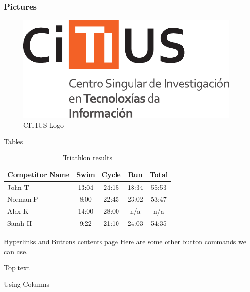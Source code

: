 \documentclass[aspectratio=169]{beamer}
\begin{document}
\begin{frame}
\frametitle{Pictures}
\begin{figure}
\includegraphics[scale=0.5]{img/logo_CiTIUS}
\caption{CITIUS Logo}
\end{figure}
\end{frame}

\begin{frame}{Tables}
\begin{table}
\begin{tabular}{l | c | c | c | c }
Competitor Name & Swim & Cycle & Run & Total \\
\hline \hline
John T & 13:04 & 24:15 & 18:34 & 55:53 \\ 
Norman P & 8:00 & 22:45 & 23:02 & 53:47\\
Alex K & 14:00 & 28:00 & n/a & n/a\\
Sarah H & 9:22 & 21:10 & 24:03 & 54:35 
\end{tabular}
\caption{Triathlon results}
\end{table}
\end{frame}

\begin{frame}{Hyperlinks and Buttons}
\hyperlink{contents}{contents page}
Here are some other button commands we can use.

\hyperlink{columns}{}

\hyperlink{pictures}{}

\hyperlink{pictures}{}
\end{frame}

\begin{frame}[t]{Top text}
    \lipsum[66]
\end{frame}

\begin{frame}{Using Columns}
    \begin{columns}
        \lipsum[66]
        \lipsum[66]
    \end{columns}
\end{frame}
\end{document}
